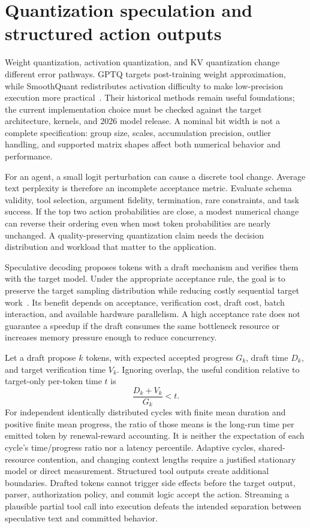 \section{Quantization speculation and structured action outputs}\label{sec:C31:05}
Weight quantization, activation quantization, and KV quantization change different error pathways. GPTQ targets post-training weight approximation, while SmoothQuant redistributes activation difficulty to make low-precision execution more practical~\cite{frantar2022gptq,xiao2022smoothquant}. Their historical methods remain useful foundations; the current implementation choice must be checked against the target architecture, kernels, and 2026 model release. A nominal bit width is not a complete specification: group size, scales, accumulation precision, outlier handling, and supported matrix shapes affect both numerical behavior and performance.

For an agent, a small logit perturbation can cause a discrete tool change. Average text perplexity is therefore an incomplete acceptance metric. Evaluate schema validity, tool selection, argument fidelity, termination, rare constraints, and task success. If the top two action probabilities are close, a modest numerical change can reverse their ordering even when most token probabilities are nearly unchanged. A quality-preserving quantization claim needs the decision distribution and workload that matter to the application.

Speculative decoding proposes tokens with a draft mechanism and verifies them with the target model. Under the appropriate acceptance rule, the goal is to preserve the target sampling distribution while reducing costly sequential target work~\cite{leviathan2022speculative}. Its benefit depends on acceptance, verification cost, draft cost, batch interaction, and available hardware parallelism. A high acceptance rate does not guarantee a speedup if the draft consumes the same bottleneck resource or increases memory pressure enough to reduce concurrency.

Let a draft propose $k$ tokens, with expected accepted progress $G_k$, draft time $D_k$, and target verification time $V_k$. Ignoring overlap, the useful condition relative to target-only per-token time $t$ is
\begin{equation}
 \frac{D_k+V_k}{G_k}<t.
\end{equation}
For independent identically distributed cycles with finite mean duration and positive finite mean progress, the ratio of those means is the long-run time per emitted token by renewal-reward accounting. It is neither the expectation of each cycle's time/progress ratio nor a latency percentile. Adaptive cycles, shared-resource contention, and changing context lengths require a justified stationary model or direct measurement. Structured tool outputs create additional boundaries. Drafted tokens cannot trigger side effects before the target output, parser, authorization policy, and commit logic accept the action. Streaming a plausible partial tool call into execution defeats the intended separation between speculative text and committed behavior.

